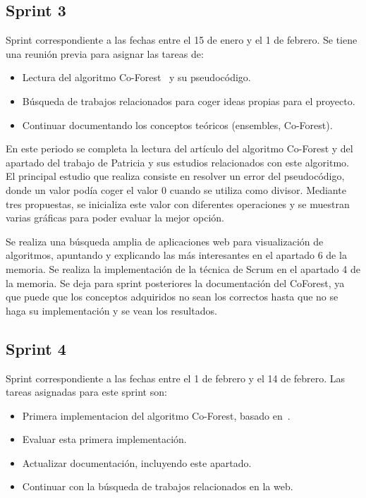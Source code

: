 \subsection{Sprint 3}
Sprint correspondiente a las fechas entre el 15 de enero y el 1 de febrero. Se tiene una reunión previa para asignar las tareas de: 
\begin{itemize}
	\item Lectura del algoritmo Co-Forest~\cite{IEEE:CoForest} y su pseudocódigo.
	\item Búsqueda de trabajos relacionados para coger ideas propias para el proyecto.
	\item Continuar documentando los conceptos teóricos (ensembles, Co-Forest).
\end{itemize}

En este periodo se completa la lectura del artículo del algoritmo Co-Forest y del apartado del trabajo de Patricia y sus estudios relacionados con este algoritmo. El principal estudio que realiza consiste en resolver un error del pseudocódigo, donde un valor podía coger el valor 0 cuando se utiliza como divisor. Mediante tres propuestas, se inicializa este valor con diferentes operaciones y se muestran varias gráficas para poder evaluar la mejor opción.

Se realiza una búsqueda amplia de aplicaciones web para visualización de algoritmos, apuntando y explicando las más interesantes en el apartado 6 de la memoria.
Se realiza la implementación de la técnica de Scrum en el apartado 4 de la memoria.
Se deja para sprint posteriores la documentación del CoForest, ya que puede que los conceptos adquiridos no sean los correctos hasta que no se haga su implementación y se vean los resultados.

\subsection{Sprint 4}
Sprint correspondiente a las fechas entre el 1 de febrero y el 14 de febrero. Las tareas asignadas para este sprint son:
\begin{itemize}
	\item Primera implementacion del algoritmo Co-Forest, basado en~\cite{IEEE:CoForest}.
	\item Evaluar esta primera implementación.
	\item Actualizar documentación, incluyendo este apartado.
	\item Continuar con la búsqueda de trabajos relacionados en la web.
\end{itemize}

